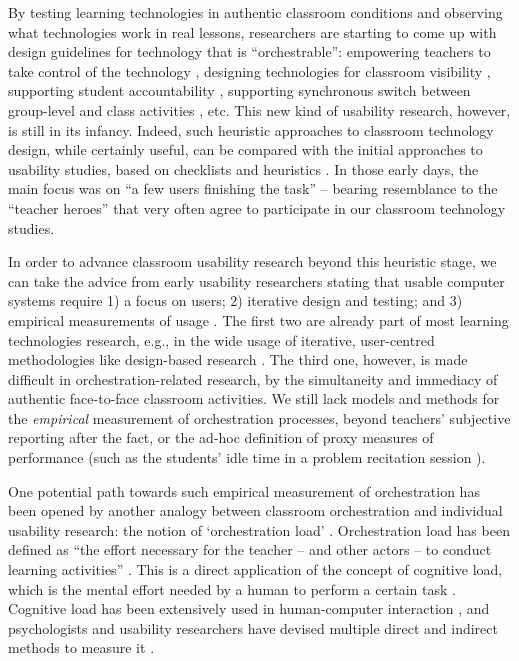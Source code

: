 \documentclass[10pt,journal,compsoc]{IEEEtran}
\begin{document}
By testing learning technologies in authentic classroom conditions and observing what technologies work in real lessons, researchers are starting to come up with design guidelines for technology that is ``orchestrable'': empowering teachers to take control of the technology \cite{Cuendet2013}, designing technologies for classroom visibility \cite{Dillenbourg2013}, supporting student accountability \cite{Kharrufa2013}, supporting synchronous switch between group-level and class activities \cite{Kreitmayer2013}, etc. This new kind of usability research, however, is still in its infancy. Indeed, such heuristic approaches to classroom technology design, while certainly useful, can be compared with the initial approaches to usability studies, based on checklists \cite{ravden1989evaluating} and heuristics \cite{nielsen1992finding}. In those early days, the main focus was on ``a few users finishing the task'' \cite{Webusability} -- bearing resemblance to the ``teacher heroes'' \cite{Dillenbourg2009b} that very often agree to participate in our classroom technology studies. 

In order to advance classroom usability research beyond this heuristic stage, we can take the advice from early usability researchers stating that usable computer systems require 1) a focus on users; 2) iterative design and testing; and 3) empirical measurements of usage \cite{Gould1985}. The first two are already part of most learning technologies research, e.g., in the wide usage of iterative, user-centred methodologies like design-based research \cite{wang2005design}. The third one, however, is made difficult in orchestration-related research, by the simultaneity and immediacy of authentic face-to-face classroom activities. We still lack models and methods for the \textit{empirical} measurement of orchestration processes, beyond teachers' subjective reporting after the fact, or the ad-hoc definition of proxy measures of performance (such as the students' idle time in a problem recitation session \cite{Alavi2012}).

One potential path towards such empirical measurement of orchestration has been opened by another analogy between classroom orchestration and individual usability research: the notion of `orchestration load' \cite{Dillenbourg2013}. Orchestration load has been defined as ``the effort necessary for the teacher -- and other actors -- to conduct learning activities'' \cite{Cuendet2013}. This is a direct application of the concept of cognitive load, which is the mental effort needed by a human to perform a certain task \cite{Paas2004}. Cognitive load has been extensively used in human-computer interaction \cite{oviatt2004we}, and psychologists and usability researchers have devised multiple direct and indirect methods to measure it \cite{Brunken2003}. 
\end{document}
